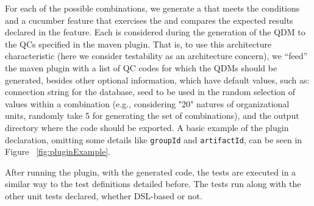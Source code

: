 For each of the possible combinations, we generate a \shc that meets the conditions 
and a cucumber feature that exercises the \shc and compares the expected results declared in the feature. 
Each \shc is considered during the generation of the QDM to the QCs specified in the 
maven plugin. That is, to use this architecture characteristic (here we consider testability as an 
architecture concern), we ``feed'' the maven plugin with a list of QC codes for which the QDMs should be generated, 
besides other optional information, which have default values, such as: connection string for the database, 
seed to be used in the random selection of values within a combination (e.g., considering "20" natures of 
organizational units, randomly take 5 for generating the set of combinations), and the output directory 
where the code should be exported. A basic example of the plugin declaration, omitting some details like 
\texttt{groupId} and \texttt{artifactId}, can be seen in Figure ~\ref{fig:pluginExample}.

After running the plugin, with the generated code, the tests are executed in a similar way to the test 
definitions detailed before. The tests run along with the other unit tests declared, 
whether DSL-based or not.

